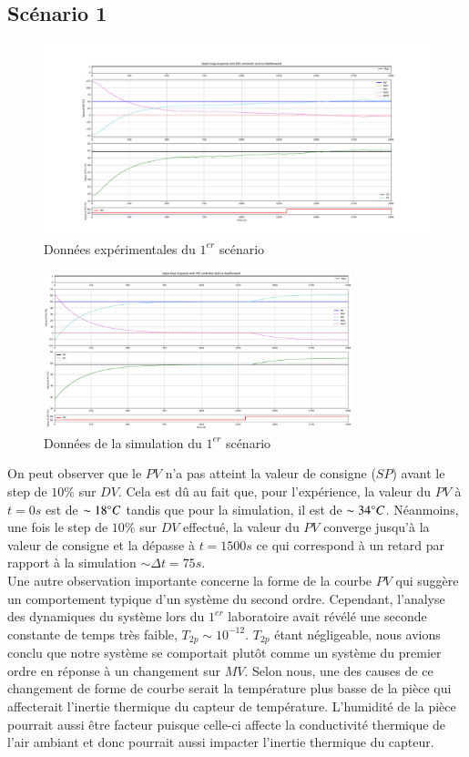 \subsection{Scénario 1}
\begin{figure}[H]
	\centering
	\includegraphics[width=1\textwidth]{../Plots/Experiment_scenario_2_2024-03-30-20h20.pdf}
	\caption{Données expérimentales du $1^{er}$ scénario}
	\label{fig:exp_scenario1}
\end{figure}
\begin{figure}[H]
	\centering
	\includegraphics[width=0.8\textwidth]{figures/scenario2.png}
	\caption{Données de la simulation du $1^{er}$ scénario}
	\label{fig:sim_scenario1}
\end{figure}

On peut observer que le $PV$ n'a pas atteint la valeur de consigne ($SP$) avant le step de $10\%$ sur $DV$. Cela est dû au fait que, pour l'expérience,
la valeur du $PV$ à $t = 0s$ est de $\sim 18\degree C$ tandis que pour la simulation, il est de $\sim 34\degree C$. Néanmoins, une fois le step de $10\%$ sur $DV$ effectué,
la valeur du $PV$ converge jusqu'à la valeur de consigne et la dépasse à $t = 1500s$ ce qui correspond à un retard par rapport à la simulation $\sim \Delta t = 75s$. 
\\Une autre observation importante concerne la forme de la courbe $PV$ qui suggère un comportement typique d'un système du second ordre. Cependant, l'analyse des dynamiques du système 
lors du $1^{er}$ laboratoire avait révélé une seconde constante de temps très faible, $T_{2p} \sim 10^{-12}$. $T_{2p}$ étant négligeable, nous avions conclu que notre système se comportait
plutôt comme un système du premier ordre en réponse à un changement sur $MV$. Selon nous, une des causes de ce changement de forme de courbe serait la température plus basse de la pièce qui affecterait 
l'inertie thermique du capteur de température. L'humidité de la pièce pourrait aussi être facteur puisque celle-ci affecte la conductivité thermique de l'air 
ambiant et donc pourrait aussi impacter l'inertie thermique du capteur.

